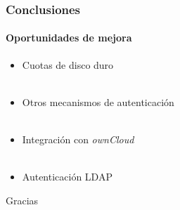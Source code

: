 \documentclass{beamer}
\begin{document}

\begin{frame}
\frametitle{Conclusiones}
\framesubtitle{Oportunidades de mejora}
\justifying
\begin{itemize}
 \item Cuotas de disco duro
\\~\\
 \item Otros mecanismos de autenticaci\'{o}n
\\~\\
 \item Integraci\'{o}n con \textsl{ownCloud}
\\~\\
 \item Autenticaci\'{o}n LDAP
\end{itemize}
\end{frame}


\begin{frame}
\Huge{\centerline{Gracias}}
\end{frame}

\end{document}
